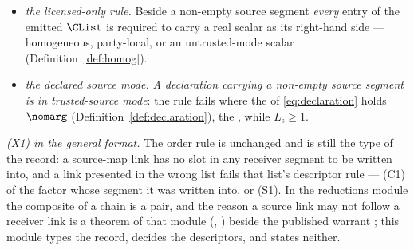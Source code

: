 \begin{definition}
\begin{itemize}[leftmargin=2.6em]
\emph{What they do not decide} is that the named claim's conclusion applies to
these descriptors --- family membership is the emitting module's assertion and
no consumer re-proves a theorem --- and a link supplying its channel as data
carries no obligation record and is decided by (S3) instead.
\item \emph{the licensed-only rule.} Beside a non-empty source segment
\emph{every} entry of the emitted $\CList$ is required to carry a real scalar
as its right-hand side --- homogeneous, party-local, or an untrusted-mode
scalar (Definition~\ref{def:homog}).
\item \emph{the declared source mode.} \emph{A declaration carrying a
non-empty source segment is in trusted-source mode}: the rule fails
where the  of \eqref{eq:declaration} holds $\nomarg$
(Definition~\ref{def:declaration}), the , while
$L_{\mathrm s}\ge1$.
\end{itemize}
\emph{(X1) in the general format.} The order rule is unchanged and is still
the type of the record: a source-map link has no slot in any receiver segment
to be written into, and a link presented in the wrong list fails that list's
descriptor rule --- (C1) of the factor whose segment it was written into, or
(S1). In the reductions module the composite of a chain is a pair, and the
reason a source link may not follow a receiver link is a theorem of that
module (,
) beside the published warrant
\cite[Rem.~9.2]{tupkary2026decoy}; this module types the record, decides the
descriptors, and states neither.
\end{definition}
